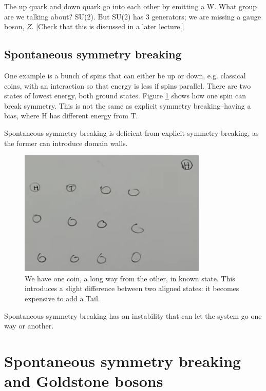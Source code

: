 \documentclass[]{article}
\begin{document}
The up quark and down quark go into each other by emitting a W. What group are we talking about? SU(2). But SU(2) has 3 generators; we are missing a gauge boson, $Z$. [Check that this is discussed in a later lecture.]

\subsection{Spontaneous symmetry breaking}
 
 One example is a bunch of spins that can either be up or down, e.g. classical coins, with an interaction so that energy is less if spins parallel. There are two states of lowest energy, both ground states. Figure \ref{fig:2-6-sponteneous} shows how one spin can break symmetry. This is not the same as explicit symmetry breaking--having a bias, where H has different energy from T.
 
 Spontaneous symmetry breaking is deficient from explicit symmetry breaking, as the former can introduce domain walls.
 \begin{figure}[H]
 	\begin{center}
 		\caption[Spontaneous symmetry breaking]{We have one coin, a long way from the other, in known state. This introduces a slight difference between two aligned states: it becomes expensive to add a Tail.}\label{fig:2-6-sponteneous}
 		\includegraphics[width=0.8\textwidth]{2-6-sponteneous}
 	\end{center}
 \end{figure}

Spontaneous symmetry breaking has an instability that can let the system go one way or another.

\section{Spontaneous symmetry breaking and Goldstone bosons}
\end{document}
